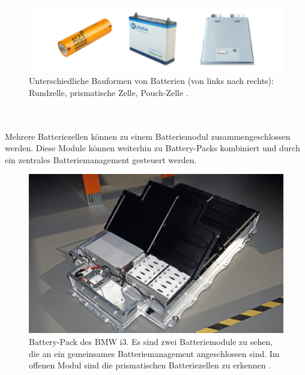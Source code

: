 \documentclass[a4paper, 11pt, headsepline,footsepline,twoside,abstract]{scrbook}
\begin{document}
\begin{figure}[h]
	\centering
	\includegraphics[width=1\columnwidth]{images/rund_prisma_pouch.jpg}
	\caption{Unterschiedliche Bauformen von Batterien (von links nach rechts): Rundzelle, prismatische Zelle, Pouch-Zelle \cite{bub_skript}.}
	\label{vergleich_bauformen}
\end{figure}
\\\\
Mehrere Batteriezellen können zu einem Batteriemodul zusammengeschlossen werden. Diese Module können weiterhin zu Battery-Packs kombiniert und durch ein zentrales Batteriemanagement gesteuert werden.
\begin{figure}[h]
	\centering
	\includegraphics[width=1.0\columnwidth]{images/bmw-i3-battery-pack.png}
	\caption{Battery-Pack des BMW i3. Es sind zwei Batteriemodule zu sehen, die an ein gemeinsames Batteriemanagement angeschlossen sind. Im offenen Modul sind die prismatischen Batteriezellen zu erkennen \cite{bmwblog}.}
	\label{battery pack}
\end{figure}
\end{document}
